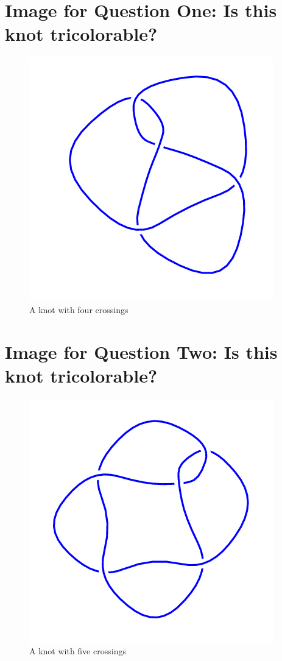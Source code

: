 \documentclass[12pt,letterpaper]{article}
\theoremstyle{definition}
\begin{document}
\setlength{\parskip}{1ex plus 0.5ex minus 0.2ex}
\setlength{\parindent}{0pt}

\pagestyle{fancy}
\cfoot{}

\section*{Image for Question One: Is this knot tricolorable?}

\begin{figure}[h]
    \centering
    \includegraphics[width=.45\textwidth]{knotpics/4_1.png}
    \caption{A knot with four crossings}
\end{figure}

\section*{Image for Question Two: Is this knot tricolorable?}

\begin{figure}[h]
    \centering
    \includegraphics[width=.45\textwidth]{knotpics/5_2mirror.png}
    \caption{A knot with five crossings}
\end{figure}
\end{document}
